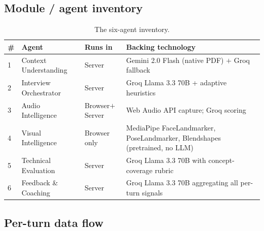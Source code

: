 \documentclass[11pt,a4paper]{article}
\begin{document}
\subsection{Module / agent inventory}

\begin{table}[h]
\centering
\renewcommand{\arraystretch}{1.25}
\begin{tabular}{@{}p{0.6cm} p{4.0cm} p{2.5cm} p{6.5cm}@{}}
\toprule
\textbf{\#} & \textbf{Agent} & \textbf{Runs in} & \textbf{Backing technology} \\
\midrule
1 & Context Understanding   & Server         & Gemini 2.0 Flash (native PDF) $+$ Groq fallback \\
2 & Interview Orchestrator  & Server         & Groq Llama 3.3 70B + adaptive heuristics \\
3 & Audio Intelligence      & Browser$+$Server & Web Audio API capture; Groq scoring \\
4 & Visual Intelligence     & Browser only   & MediaPipe FaceLandmarker, PoseLandmarker, Blendshapes (pretrained, no LLM) \\
5 & Technical Evaluation    & Server         & Groq Llama 3.3 70B with concept-coverage rubric \\
6 & Feedback \& Coaching    & Server         & Groq Llama 3.3 70B aggregating all per-turn signals \\
\bottomrule
\end{tabular}
\caption{The six-agent inventory.}
\end{table}

\subsection{Per-turn data flow}
\end{document}
